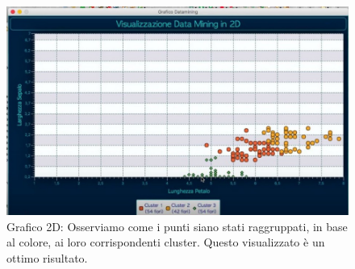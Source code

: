 \documentclass[a4paper, oneside]{book}
\begin{document}
\begin{figure}[htp]
\centering
\includegraphics[width=13cm]{10.bmp}
\caption{Grafico 2D: Osserviamo come i punti siano stati raggruppati, in base al colore, ai loro corrispondenti cluster. Questo visualizzato è un ottimo risultato.}
\label{fig:grafico 2D}
\end{figure}
\end{document}
